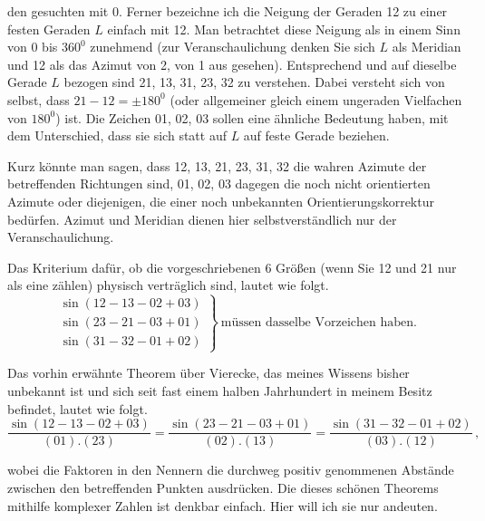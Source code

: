 den gesuchten mit 0. Ferner bezeichne ich die Neigung der Geraden 12 zu einer festen Geraden $L$ einfach mit 12. Man betrachtet diese Neigung als in einem  Sinn von 0 bis $360^0$ zunehmend (zur Veranschaulichung denken Sie sich $L$ als Meridian und 12 als das Azimut von 2, von 1 aus gesehen). Entsprechend und auf dieselbe Gerade $L$ bezogen sind 21, 13, 31, 23, 32 zu verstehen. Dabei versteht sich von selbst, dass $21-12=\pm180^0$ (oder allgemeiner gleich einem ungeraden Vielfachen von $180^0$) ist. Die Zeichen 01, 02, 03 sollen eine ähnliche Bedeutung haben, mit dem Unterschied, dass sie sich statt auf $L$ auf  feste Gerade beziehen.

Kurz könnte man sagen, dass 12, 13, 21, 23, 31, 32 die wahren Azimute der betreffenden Richtungen sind, 01, 02, 03 dagegen die noch nicht orientierten Azimute oder diejenigen, die einer noch unbekannten Orientierungskorrektur bedürfen. Azimut und Meridian dienen hier selbstverständlich nur der Veranschaulichung.

Das Kriterium dafür, ob die vorgeschriebenen 6 Größen (wenn Sie 12 und 21 nur als eine zählen) physisch verträglich sind, lautet wie folgt.
\[
\left.
\begin{array}{l}
\sin(12-13-02+03)\\
\sin(23-21-03+01)\\
\sin(31-32-01+02)
\end{array}
\right\}\ \text{müssen dasselbe Vorzeichen haben.}
\]

Das vorhin erwähnte Theorem über Vierecke, das meines Wissens bisher unbekannt ist und sich seit fast einem halben Jahrhundert in meinem Besitz befindet, lautet wie folgt.
\[
\frac{\sin(12-13-02+03)}{(01).(23)}=\frac{\sin(23-21-03+01)}{(02).(13)}=\frac{\sin(31-32-01+02)}{(03).(12)}\,,
\]

wobei die Faktoren in den Nennern die durchweg positiv genommenen Abstände zwischen den betreffenden Punkten ausdrücken. Die  dieses schönen Theorems mithilfe komplexer Zahlen ist denkbar einfach. Hier will ich sie nur andeuten.



